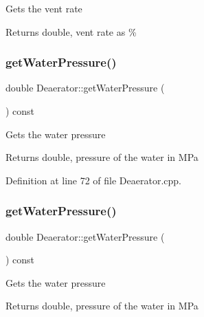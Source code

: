 Gets the vent rate \begin{DoxyReturn}{Returns}
double, vent rate as \% 
\end{DoxyReturn}
\mbox{\label{class_deaerator_ae86ef305a8641d61ec76bd39bb84f28b}} 
\subsubsection{\texorpdfstring{get\+Water\+Pressure()}{getWaterPressure()}\hspace{0.1cm}{\footnotesize\ttfamily [1/3]}}
{\footnotesize\ttfamily double Deaerator\+::get\+Water\+Pressure (\begin{DoxyParamCaption}{ }\end{DoxyParamCaption}) const}

Gets the water pressure \begin{DoxyReturn}{Returns}
double, pressure of the water in M\+Pa 
\end{DoxyReturn}


Definition at line 72 of file Deaerator.\+cpp.

\mbox{\label{class_deaerator_ae86ef305a8641d61ec76bd39bb84f28b}} 
\subsubsection{\texorpdfstring{get\+Water\+Pressure()}{getWaterPressure()}\hspace{0.1cm}{\footnotesize\ttfamily [2/3]}}
{\footnotesize\ttfamily double Deaerator\+::get\+Water\+Pressure (\begin{DoxyParamCaption}{ }\end{DoxyParamCaption}) const}

Gets the water pressure \begin{DoxyReturn}{Returns}
double, pressure of the water in M\+Pa 
\end{DoxyReturn}
\mbox{\label{class_deaerator_ae86ef305a8641d61ec76bd39bb84f28b}} 
